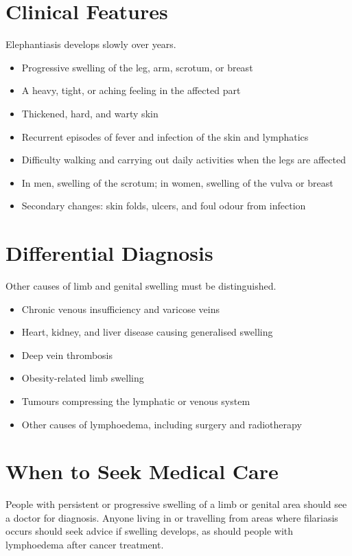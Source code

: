 \section*{Clinical Features}
Elephantiasis develops slowly over years.
\begin{itemize}
    \item Progressive swelling of the leg, arm, scrotum, or breast
    \item A heavy, tight, or aching feeling in the affected part
    \item Thickened, hard, and warty skin
    \item Recurrent episodes of fever and infection of the skin and lymphatics
    \item Difficulty walking and carrying out daily activities when the legs are affected
    \item In men, swelling of the scrotum; in women, swelling of the vulva or breast
    \item Secondary changes: skin folds, ulcers, and foul odour from infection
\end{itemize}

\section*{Differential Diagnosis}
Other causes of limb and genital swelling must be distinguished.
\begin{itemize}
    \item Chronic venous insufficiency and varicose veins
    \item Heart, kidney, and liver disease causing generalised swelling
    \item Deep vein thrombosis
    \item Obesity-related limb swelling
    \item Tumours compressing the lymphatic or venous system
    \item Other causes of lymphoedema, including surgery and radiotherapy
\end{itemize}

\section*{When to Seek Medical Care}
People with persistent or progressive swelling of a limb or genital area should see a doctor for diagnosis. Anyone living in or travelling from areas where filariasis occurs should seek advice if swelling develops, as should people with lymphoedema after cancer treatment.

